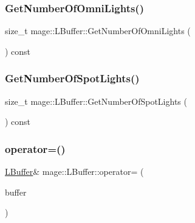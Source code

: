 \hypertarget{structmage_1_1_l_buffer_a491fdf6d191796a371c6456094158eb9}{}\label{structmage_1_1_l_buffer_a491fdf6d191796a371c6456094158eb9} 
\subsubsection{\texorpdfstring{Get\+Number\+Of\+Omni\+Lights()}{GetNumberOfOmniLights()}}
{\footnotesize\ttfamily size\+\_\+t mage\+::\+L\+Buffer\+::\+Get\+Number\+Of\+Omni\+Lights (\begin{DoxyParamCaption}{ }\end{DoxyParamCaption}) const\hspace{0.3cm}{\ttfamily [noexcept]}}

\hypertarget{structmage_1_1_l_buffer_af4b83d179c5578ff84b06704ce1b0359}{}\label{structmage_1_1_l_buffer_af4b83d179c5578ff84b06704ce1b0359} 
\subsubsection{\texorpdfstring{Get\+Number\+Of\+Spot\+Lights()}{GetNumberOfSpotLights()}}
{\footnotesize\ttfamily size\+\_\+t mage\+::\+L\+Buffer\+::\+Get\+Number\+Of\+Spot\+Lights (\begin{DoxyParamCaption}{ }\end{DoxyParamCaption}) const\hspace{0.3cm}{\ttfamily [noexcept]}}

\hypertarget{structmage_1_1_l_buffer_ae2bbc95b108adcbfb52ac7165bbb7bcf}{}\label{structmage_1_1_l_buffer_ae2bbc95b108adcbfb52ac7165bbb7bcf} 
\subsubsection{\texorpdfstring{operator=()}{operator=()}\hspace{0.1cm}{\footnotesize\ttfamily [1/2]}}
{\footnotesize\ttfamily \hyperlink{structmage_1_1_l_buffer}{L\+Buffer}\& mage\+::\+L\+Buffer\+::operator= (\begin{DoxyParamCaption}\item[{const \hyperlink{structmage_1_1_l_buffer}{L\+Buffer} \&}]{buffer }\end{DoxyParamCaption})\hspace{0.3cm}{\ttfamily [delete]}}

